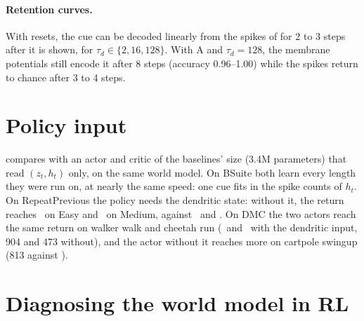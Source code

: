 \paragraph{Retention curves.}
With resets, the cue can be decoded linearly from the spikes of \swm for 2 to 3 steps after it is shown, for $\tau_d\in\{2,16,128\}$.
With A and $\tau_d=128$, the membrane potentials still encode it after 8 steps (accuracy 0.96--1.00) while the spikes return to chance after 3 to 4 steps.

\section{Policy input}
\label{supp:policy}

\begin{table}[t]
  \centering\tabfont
  \caption{\textbf{Actor input of \method.} The world model is the same; only the features of the actor and critic differ. First row: \method as in all other tables. : in progress; \nr: not run.}
  \label{tab:policy}
  
\end{table}

 compares \method with an actor and critic of the baselines' size (3.4M parameters) that read $(z_t,h_t)$ only, on the same world model.
On BSuite both learn every length they were run on, at nearly the same speed: one cue fits in the spike counts of $h_t$.
On RepeatPrevious the policy needs the dendritic state: without it, the return reaches \numAltEasy\ on Easy and \numAltMedium\ on Medium, against \numFwfEasy\ and \numFwfMedium.
On DMC the two actors reach the same return on walker walk and cheetah run (\numFwfDmcWalk\ and \numFwfDmcRun\ with the dendritic input, 904 and 473 without), and the actor without it reaches more on cartpole swingup (813 against \numFwfDmcSwing).

\section{Diagnosing the world model in RL}
\label{supp:diag}

